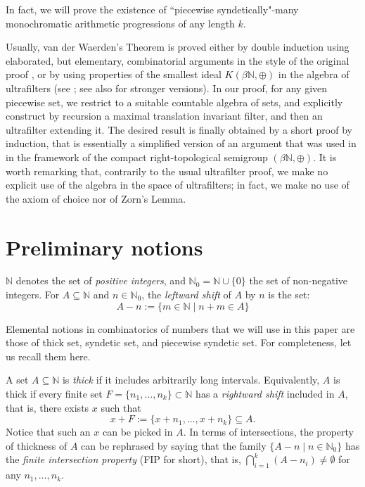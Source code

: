 \documentclass[10pt]{amsart}
\theoremstyle{definition}
\theoremstyle{remark}
\def\N{\mathbb{N}}
\begin{document}
\smallskip
In fact, we will prove the 
existence of ``piecewise syndetically"-many
monochromatic arithmetic progressions
of any length $k$.

Usually, van der Waerden's Theorem is proved either by double
induction using elaborated, but elementary, combinatorial arguments
in the style of the original proof \cite{vdW},
or by using properties of the smallest ideal 
$K(\beta\N,\oplus)$ in the algebra
of ultrafilters (see \cite[Ch.14]{hs}; see also
\cite{fg,bh} for stronger versions).
In our proof, for any given piecewise set,
we restrict to a suitable countable algebra
of sets, and explicitly construct by recursion a maximal translation invariant
filter, and then an ultrafilter extending it.
The desired result is finally obtained by a short proof by induction,
that is essentially a simplified version of an argument
that was used in \cite{h} in the framework of
the compact right-topological semigroup $(\beta\N,\oplus)$.
It is worth remarking that,
contrarily to the usual ultrafilter proof, we make no explicit use
of the algebra in the space of ultrafilters; in fact,
we make no use of the axiom of choice nor of
Zorn's Lemma.


\section{Preliminary notions}

$\N$ denotes the set of \emph{positive integers}, 
and $\N_0=\N\cup\{0\}$ the set
of non-negative integers.
For $A\subseteq\N$ and $n\in\N_0$, 
the \emph{leftward shift} of $A$ by $n$ is the set:
$$A-n:=\{m\in\N\mid n+m\in A\}$$

Elemental notions in combinatorics of numbers that we will use
in this paper are those of thick set, syndetic set, and piecewise syndetic set.
For completeness, let us recall them here.

A set $A\subseteq\N$ is \emph{thick} if it includes arbitrarily long intervals.
Equivalently, $A$ is thick if every finite set $F=\{n_1,\ldots,n_k\}\subset\N$
has a \emph{rightward shift} included in $A$, that is, there exists $x$ such that
$$x+F:=\{x+n_1,\ldots,x+n_k\}\subseteq A.$$ 
Notice that such an $x$ can
be picked in $A$. In terms of intersections, the property
of thickness of $A$ can be rephrased by saying that
the family $\{A-n\mid n\in\N_0\}$ has the \emph{finite intersection property}
(FIP for short), that is, $\bigcap_{i=1}^k(A-n_i)\ne\emptyset$
for any $n_1,\ldots,n_k$. 
\end{document}
